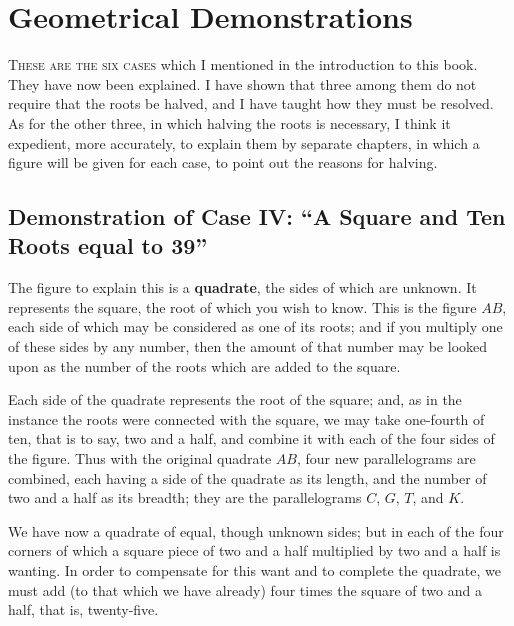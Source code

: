 \documentclass[11pt,a4paper]{book}
\begin{document}
\newpage

\chapter{Geometrical Demonstrations}
\label{ch:geom}

\lettrine[lines=3, lhang=0.33, nindent=0em, findent=3pt]{
\textcolor{dropgold}{T}}{hese are the six cases} which I mentioned in the introduction to this
book. They have now been explained. I have shown that three among them do not
require that the roots be halved, and I have taught how they must be resolved.
As for the other three, in which halving the roots is necessary, I think it
expedient, more accurately, to explain them by separate chapters, in which a
figure will be given for each case, to point out the reasons for halving.

\section{Demonstration of Case IV: ``A Square and Ten Roots equal to 39''}

The figure to explain this is a \textbf{quadrate}, the sides of which are
unknown. It represents the square, the root of which you wish to know. This
is the figure $AB$, each side of which may be considered as one of its roots;
and if you multiply one of these sides by any number, then the amount of that
number may be looked upon as the number of the roots which are added to the
square.

Each side of the quadrate represents the root of the square; and, as in the
instance the roots were connected with the square, we may take one-fourth of
ten, that is to say, two and a half, and combine it with each of the four
sides of the figure. Thus with the original quadrate $AB$, four new
parallelograms are combined, each having a side of the quadrate as its
length, and the number of two and a half as its breadth; they are the
parallelograms $C$, $G$, $T$, and $K$.

We have now a quadrate of equal, though unknown sides; but in each of the
four corners of which a square piece of two and a half multiplied by two and
a half is wanting. In order to compensate for this want and to complete the
quadrate, we must add (to that which we have already) four times the square
of two and a half, that is, twenty-five.
\end{document}
